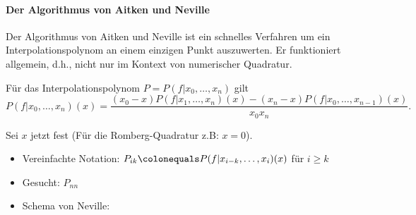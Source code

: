 \paragraph{Der Algorithmus von Aitken und Neville}

Der Algorithmus von Aitken und Neville ist ein schnelles Verfahren um ein
Interpolationspolynom an einem einzigen Punkt auszuwerten. Er funktioniert
allgemein, d.h., nicht nur im Kontext von numerischer Quadratur.

\begin{lemma}
Für das Interpolationspolynom $P = P(f | x_0, \dots, x_n)$ gilt
\begin{equation*}
P(f | x_0, \dots, x_n)(x)
=
\frac{(x_0 -x) P(f | x_1, \dots, x_n)(x) - (x_n - x) P(f | x_0, \dots, x_{n-1})(x)}{x_0  x_n}.
\end{equation*}
\end{lemma}
Sei $x$ jetzt fest (Für die Romberg-Quadratur z.B: $x = 0$).
\begin{itemize}
\item Vereinfachte Notation: $P_{ik} \colonequals P(f |x_{i-k}, \dots, x_i)(x)$ für $i \ge k$
\item Gesucht: $P_{nn}$
\item Schema von Neville:
\begin{center}
\end{center}
\end{itemize}
